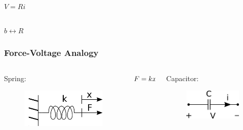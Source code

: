 \begin{frame}
\begin{columns}
		\begin{column}{0.25\linewidth}
			\hspace{3pt}
			$V = Ri$
		\end{column}
		
	\end{columns}
	
	\begin{center}
		$\boxed{b \leftrightarrow R} $	
	\end{center}
\end{frame}

\begin{frame}
	\frametitle{Force-Voltage Analogy}
	\begin{columns}
		\begin{column}{0.25\linewidth}
			Spring:
			\begin{figure}
				\includegraphics[width=1\linewidth]{img/spring}
			\end{figure}
		\end{column}
		
		\begin{column}{0.25\linewidth}
			\hspace{3pt}
			$F = kx \newline \Rightarrow \frac{dF}{dt} = k\frac{dx}{dt}$ 
		\end{column}
		
		\begin{column}{0.25\linewidth}
			Capacitor:
			\begin{figure}
				\includegraphics[width=1\linewidth]{img/capacitor}
				\label{fig:capacitor}
			\end{figure}
		\end{column}
		

\end{columns}
\end{frame}

